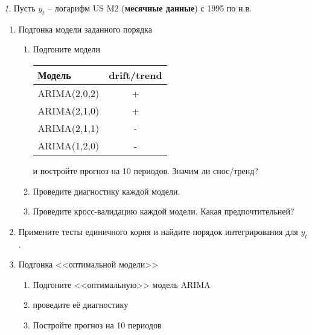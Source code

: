 \documentclass[12pt]{article}
\theoremstyle{remark}
\newtheorem{exercise}{}[subsection]
\begin{document}
\begin{exercise}
Пусть \(y_t\) -- логарифм US M2 (\textbf{месячные данные}) с 1995 по н.в.
\begin{enumerate}
	\item Подгонка модели заданного порядка
	\begin{enumerate}
		\item Подгоните модели
		\begin{center}
		\begin{tabular}{l|c}
			Модель & drift/trend \\ \hline
			ARIMA(2,0,2) & + \\
			ARIMA(2,1,0) & + \\
			ARIMA(2,1,1) & - \\
			ARIMA(1,2,0) & - \\ \hline
		\end{tabular}
		\end{center} 
		и постройте прогноз на 10 периодов. Значим ли снос/тренд?
		\item Проведите диагностику каждой модели.
		\item Проведите кросс-валидацию каждой модели. Какая предпочтительней?
	\end{enumerate}
	\item Примените тесты единичного корня и найдите порядок интегрирования для \(y_t\). 
	\item Подгонка <<оптимальной модели>>
	\begin{enumerate}
		\item Подгоните <<оптимальную>> модель ARIMA
		\item проведите её диагностику
		\item Постройте прогноз на 10 периодов
	\end{enumerate}
\end{enumerate}
\end{exercise}
\end{document}
